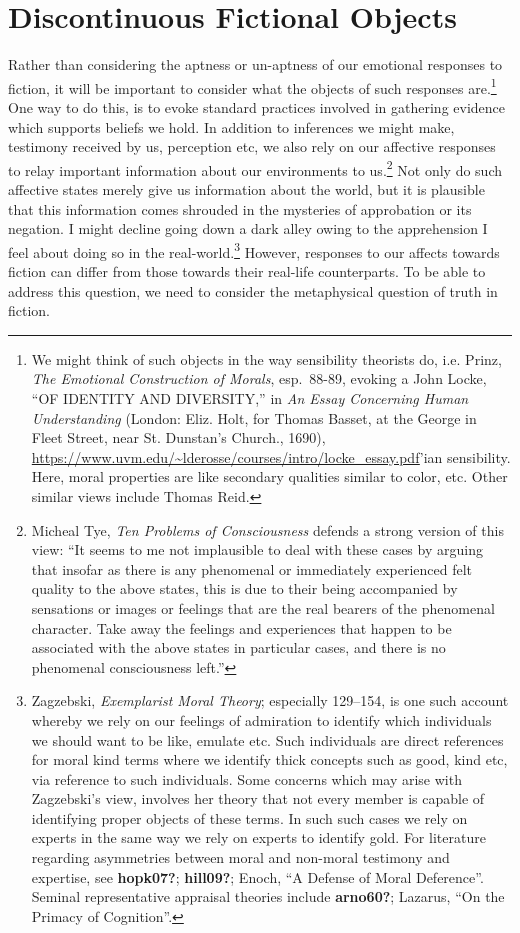\documentclass[
  12pt,
]{book}
\theoremstyle{definition}
\theoremstyle{definition}
\theoremstyle{definition}
\theoremstyle{definition}
\theoremstyle{remark}
\begin{document}
\section{Discontinuous Fictional Objects}\label{discontinuous-fictional-objects}

Rather than considering the aptness or un-aptness of our emotional responses to fiction, it will be important to consider what the objects of such responses are.\footnote{We might think of such objects in the way sensibility theorists do, i.e. Prinz, \emph{The {Emotional Construction} of {Morals}}, esp.~88-89, evoking a John Locke, {``{OF IDENTITY AND DIVERSITY},''} in \emph{An {Essay Concerning Human Understanding}} (London: Eliz. Holt, for Thomas Basset, at the George in Fleet Street, near St. Dunstan's Church., 1690), \url{https://www.uvm.edu/~lderosse/courses/intro/locke_essay.pdf}'ian sensibility. Here, moral properties are like secondary qualities similar to color, etc. Other similar views include Thomas Reid.} One way to do this, is to evoke standard practices involved in gathering evidence which supports beliefs we hold. In addition to inferences we might make, testimony received by us, perception etc, we also rely on our affective responses to relay important information about our environments to us.\footnote{Micheal Tye, \emph{Ten {Problems} of {Consciousness} } defends a strong version of this view: ``It seems to me not implausible to deal with these cases by arguing that insofar as there is any phenomenal or immediately experienced felt quality to the above states, this is due to their being accompanied by sensations or images or feelings that are the real bearers of the phenomenal character. Take away the feelings and experiences that happen to be associated with the above states in particular cases, and there is no phenomenal consciousness left.''} Not only do such affective states merely give us information about the world, but it is plausible that this information comes shrouded in the mysteries of approbation or its negation. I might decline going down a dark alley owing to the apprehension I feel about doing so in the real-world.\footnote{Zagzebski, \emph{Exemplarist {Moral Theory}}; especially 129--154, is one such account whereby we rely on our feelings of admiration to identify which individuals we should want to be like, emulate etc. Such individuals are direct references for moral kind terms where we identify thick concepts such as good, kind etc, via reference to such individuals. Some concerns which may arise with Zagzebski's view, involves her theory that not every member is capable of identifying proper objects of these terms. In such such cases we rely on experts in the same way we rely on experts to identify gold. For literature regarding asymmetries between moral and non-moral testimony and expertise, see \textbf{hopk07?}; \textbf{hill09?}; Enoch, {``A {Defense} of {Moral Deference}''}. Seminal representative appraisal theories include \textbf{arno60?}; Lazarus, {``On the {Primacy} of {Cognition}''}.} However, responses to our affects towards fiction can differ from those towards their real-life counterparts. To be able to address this question, we need to consider the metaphysical question of truth in fiction. 
\end{document}
